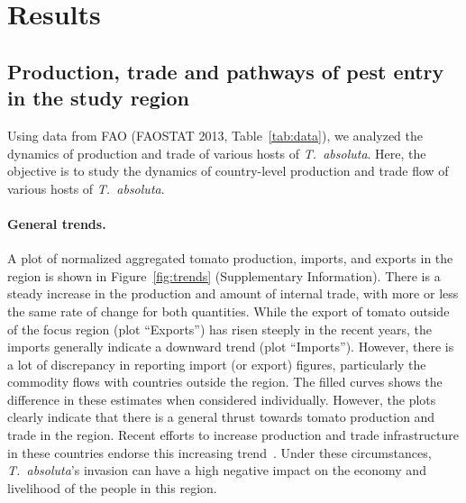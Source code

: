 \documentclass[11pt]{article}
\newcommand{\tuta}{\emph{T.~absoluta}}
\theoremstyle{definition}
\begin{document}
\section{Results}
\subsection{Production, trade and pathways of pest entry in the study region} 
\label{sec:entry}
Using data from FAO (FAOSTAT 2013, Table~\ref{tab:data}), we analyzed the
dynamics of production and trade of various hosts of \tuta{}.
Here, the objective is to study the dynamics of country-level production
and trade flow of various hosts of \tuta{}.
\paragraph{General trends.} 
A plot of normalized aggregated tomato production, imports, and exports in
the region is shown in Figure~\ref{fig:trends} (Supplementary Information). There is a steady increase in the production
and amount of internal trade, with more or less the same rate of change for
both quantities.  While the export of tomato outside of the focus region
(plot ``Exports'') has risen steeply in the recent years, the imports
generally indicate a downward trend (plot ``Imports''). However, there is a
lot of discrepancy in reporting import (or export) figures, particularly
the commodity flows with countries outside the region. The filled curves
shows the difference in these estimates when considered individually.
However, the plots clearly indicate that there is a general thrust towards
tomato production and trade in the region. Recent efforts to
increase production and trade infrastructure in these countries endorse
this increasing trend~\cite{}. Under these circumstances, \tuta{}'s
invasion can have a high negative impact on the economy and livelihood of
the people in this region.
\end{document}
